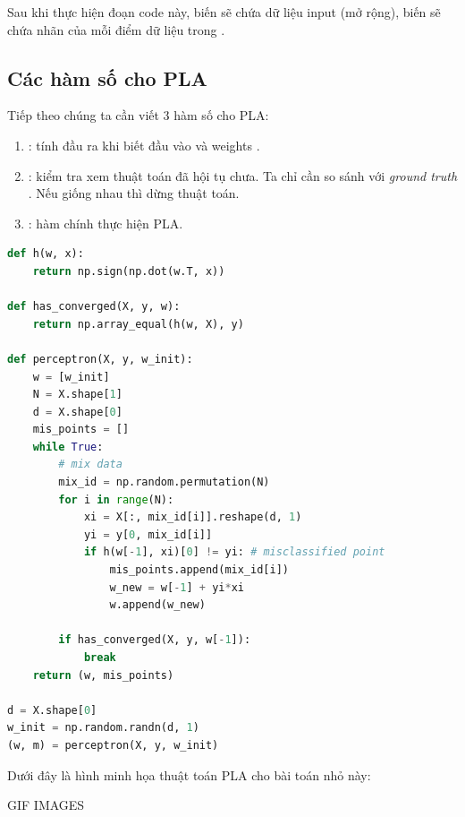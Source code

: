 Sau khi thực hiện đoạn code này, biến  sẽ chứa dữ liệu input (mở rộng), biến  sẽ chứa nhãn của mỗi điểm dữ liệu trong . 
 
\subsection{Các hàm số cho PLA}
Tiếp theo chúng ta cần viết 3 hàm số cho PLA: 
\begin{enumerate}
    \item {}: tính đầu ra khi biết đầu vào  và weights .
    \item {}: kiểm tra xem thuật toán đã hội tụ chưa. Ta chỉ cần so sánh  với \textit{ground truth} . Nếu giống nhau thì dừng thuật toán. 
    \item {}: hàm chính thực hiện PLA. 
\end{enumerate}
 
\begin{lstlisting}[language=Python]
def h(w, x):     
    return np.sign(np.dot(w.T, x)) 
 
def has_converged(X, y, w):     
    return np.array_equal(h(w, X), y)  
 
def perceptron(X, y, w_init): 
    w = [w_init] 
    N = X.shape[1] 
    d = X.shape[0] 
    mis_points = [] 
    while True: 
        # mix data  
        mix_id = np.random.permutation(N) 
        for i in range(N): 
            xi = X[:, mix_id[i]].reshape(d, 1) 
            yi = y[0, mix_id[i]] 
            if h(w[-1], xi)[0] != yi: # misclassified point 
                mis_points.append(mix_id[i]) 
                w_new = w[-1] + yi*xi  
                w.append(w_new) 
                 
        if has_converged(X, y, w[-1]): 
            break 
    return (w, mis_points) 
 
d = X.shape[0] 
w_init = np.random.randn(d, 1) 
(w, m) = perceptron(X, y, w_init) 
\end{lstlisting}
 
Dưới đây là hình minh họa thuật toán PLA cho bài toán nhỏ này: 
 

{\color{red} GIF IMAGES}

